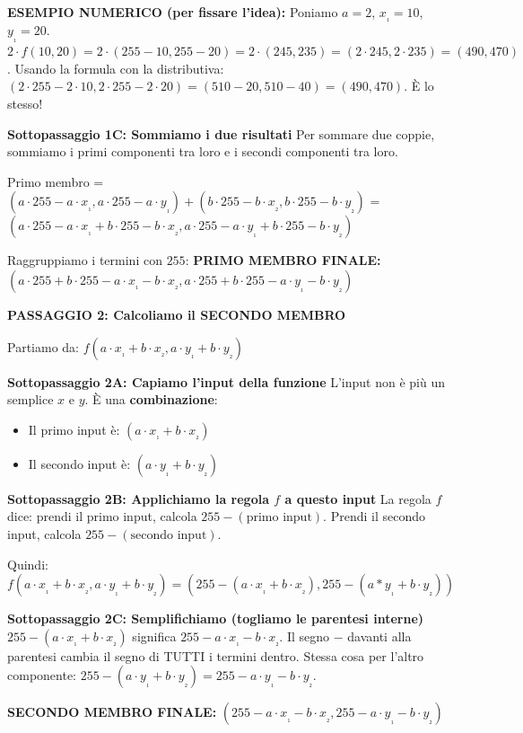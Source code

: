 \documentclass[
]{article}
\providecommand{\tightlist}{%
  \setlength{\itemsep}{0pt}\setlength{\parskip}{0pt}}
\begin{document}
\textbf{ESEMPIO NUMERICO (per fissare l'idea):}
Poniamo \(a=2\), \(x_₁=10\), \(y_₁=20\).
\(2 \cdot f(10, 20) = 2 \cdot (255-10, 255-20) = 2 \cdot (245, 235) = (2\cdot245, 2\cdot235) = (490, 470)\).
Usando la formula con la distributiva: \((2\cdot255 - 2\cdot10, 2\cdot255 - 2\cdot20) = (510 - 20, 510 - 40) = (490, 470)\). È lo stesso!

\textbf{Sottopassaggio 1C: Sommiamo i due risultati}
Per sommare due coppie, sommiamo i primi componenti tra loro e i secondi componenti tra loro.

Primo membro = \((a\cdot255 - a\cdot x_₁, a\cdot255 - a\cdot y_₁) + (b\cdot255 - b\cdot x_₂, b\cdot255 - b\cdot y_₂)\)
= \((a\cdot255 - a\cdot x_₁ + b\cdot255 - b\cdot x_₂, a\cdot255 - a\cdot y_₁ + b\cdot255 - b\cdot y_₂)\)

Raggruppiamo i termini con \(255\):
\textbf{PRIMO MEMBRO FINALE:} \((a\cdot255 + b\cdot255 - a\cdot x_₁ - b\cdot x_₂, a\cdot255 + b\cdot255 - a\cdot y_₁ - b\cdot y_₂)\)

\textbf{PASSAGGIO 2: Calcoliamo il SECONDO MEMBRO}

Partiamo da: \(f(a\cdot x_₁ + b\cdot x_₂, a\cdot y_₁ + b\cdot y_₂)\)

\textbf{Sottopassaggio 2A: Capiamo l'input della funzione}
L'input non è più un semplice \(x\) e \(y\). È una \textbf{combinazione}:

\begin{itemize}
\tightlist
\item
  Il primo input è: \((a\cdot x_₁ + b\cdot x_₂)\)
\item
  Il secondo input è: \((a\cdot y_₁ + b\cdot y_₂)\)
\end{itemize}

\textbf{Sottopassaggio 2B: Applichiamo la regola \(f\) a questo input}
La regola \(f\) dice: prendi il primo input, calcola \(255 - (\text{primo input})\). Prendi il secondo input, calcola \(255 - (\text{secondo input})\).

Quindi:
\(f(a\cdot x_₁ + b \cdot x_₂, a \cdot y_₁ + b \cdot y_₂) = (255 - (a \cdot x_₁ + b \cdot x_₂), 255 - (a*y_₁ + b \cdot y_₂))\)

\textbf{Sottopassaggio 2C: Semplifichiamo (togliamo le parentesi interne)}
\(255 - (a\cdot x_₁ + b \cdot x_₂)\) significa \(255 - a\cdot x_₁ - b \cdot x_₂\). Il segno \(-\) davanti alla parentesi cambia il segno di TUTTI i termini dentro.
Stessa cosa per l'altro componente: \(255 - (a\cdot y_₁ + b\cdot y_₂) = 255 - a \cdot y_₁ - b \cdot y_₂\).

\textbf{SECONDO MEMBRO FINALE:} \((255 - a \cdot x_₁ - b \cdot x_₂, 255 - a \cdot y_₁ - b \cdot y_₂)\)
\end{document}
